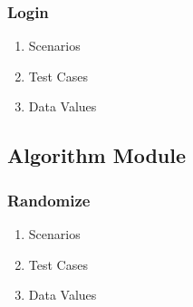 \documentclass[hidelinks, 12pt, oneside]{article}
\begin{document}
\subsubsection{Login}
\begin{enumerate}
\item Scenarios
\item Test Cases
\item Data Values
\end{enumerate}

\subsection{Algorithm Module}
\subsubsection{Randomize}
\begin{enumerate}
\item Scenarios
\item Test Cases
\item Data Values
\end{enumerate}
\end{document}
